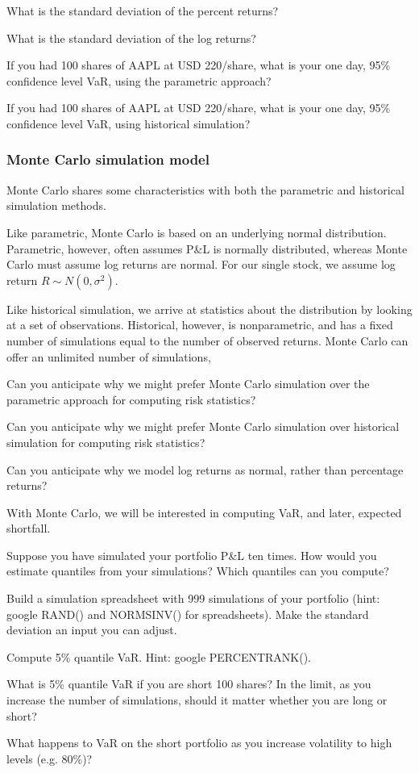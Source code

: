 \documentclass{report}
\numberwithin{problem}{chapter} %
\let\oldroblem\problem
\renewcommand{\problem}{ \oldroblem  \normalfont}
\newcommand{\pnl}{P\&L }
\begin{document}
\problem What is the standard deviation of the percent returns?

\problem What is the standard deviation of the log returns?

\problem If you had 100 shares of AAPL at USD 220/share, what is your one day, 95\% confidence level VaR, using the parametric approach?

\problem If you had 100 shares of AAPL at USD 220/share, what is your one day, 95\% confidence level VaR, using  historical simulation?

\subsubsection{Monte Carlo simulation model}
Monte Carlo shares some characteristics with both the parametric and historical simulation methods. 

Like parametric, Monte Carlo is based on an underlying normal distribution. Parametric, however, often assumes \pnl is normally distributed, whereas Monte Carlo must assume log returns are normal. For our single stock, we assume log return $R \sim N(0, \sigma^2)$.

Like historical simulation, we arrive at statistics about the distribution by looking at a set of observations. Historical, however, is nonparametric, and has a fixed number of simulations equal to the number of observed returns. Monte Carlo can offer an unlimited number of simulations,

\problem Can you anticipate why we might prefer Monte Carlo simulation over the parametric approach for computing risk statistics?

\problem Can you anticipate why we might prefer Monte Carlo simulation over historical simulation for computing risk statistics?

\problem Can you anticipate why we model log returns as normal, rather than percentage returns?

With Monte Carlo, we will be interested in computing VaR, and later, expected shortfall. 

\problem Suppose you have simulated your portfolio \pnl ten times. How would you estimate quantiles from your simulations? Which quantiles can you compute?

\problem Build a simulation spreadsheet with 999 simulations of your portfolio (hint: google RAND() and NORMSINV() for spreadsheets). Make the standard deviation an input you can adjust. 

\problem Compute 5\% quantile VaR. Hint: google PERCENTRANK().

\problem What is 5\% quantile VaR if you are short 100 shares? In the limit, as you increase the number of simulations, should it matter whether you are long or short? 

\problem What happens to VaR on the short portfolio as you increase volatility to high levels (e.g. 80\%)?



\end{document}
